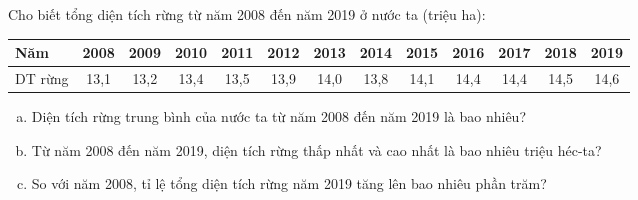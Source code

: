 \begin{bt}
	Cho biết tổng diện tích rừng từ năm 2008 đến năm 2019 ở nước ta (triệu ha):
	\begin{center}
	\begin{tabular}{|l|c|c|c|c|c|c|c|c|c|c|c|c|}
		\hline
		Năm & 2008 & 2009 & 2010 & 2011 & 2012 & 2013 & 2014 & 2015 & 2016 & 2017 & 2018 & 2019 \\
		\hline
		DT rừng & 13,1 & 13,2 & 13,4 & 13,5 & 13,9 & 14,0 & 13,8 & 14,1 & 14,4 & 14,4 & 14,5 & 14,6 \\
		\hline
	\end{tabular}
	\end{center}
	\begin{enumerate}[a)]
		\item Diện tích rừng trung bình của nước ta từ năm 2008 đến năm 2019 là bao nhiêu?
		\item Từ năm 2008 đến năm 2019, diện tích rừng thấp nhất và cao nhất là bao nhiêu triệu héc-ta?
		\item So với năm 2008, tỉ lệ tổng diện tích rừng năm 2019 tăng lên bao nhiêu phần trăm?
	\end{enumerate}
\end{bt}

